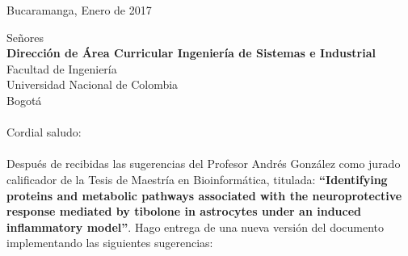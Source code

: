 \documentclass[12pt,a4paper]{article}
\begin{document}
\pagestyle{empty}
\begin{flushright}
Bucaramanga, Enero de 2017
\end{flushright}
Señores\\
\textbf{Dirección de Área Curricular Ingeniería de Sistemas e Industrial}\\
Facultad de Ingeniería\\
Universidad Nacional de Colombia\\
Bogotá\\
\\
Cordial saludo:\\
\\
Después de recibidas las sugerencias del Profesor Andrés González como jurado calificador de la Tesis de Maestría en Bioinformática, titulada: \textbf{“Identifying proteins and metabolic pathways associated with the neuroprotective response mediated by tibolone in astrocytes under an induced inflammatory model”}. Hago entrega de una nueva versión del documento implementando las siguientes sugerencias:
\end{document}
